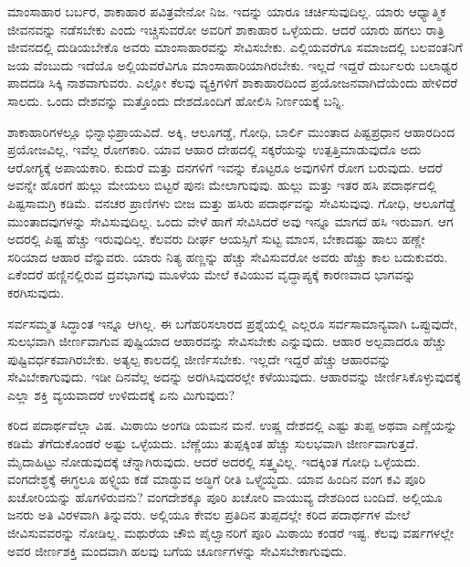 ಮಾಂಸಾಹಾರ ಬರ್ಬರ, ಶಾಕಾಹಾರ ಪವಿತ್ರವೇನೋ ನಿಜ. ಇದನ್ನು ಯಾರೂ ಚರ್ಚಿಸುವುದಿಲ್ಲ. ಯಾರು ಆಧ್ಯಾತ್ಮಿಕ ಜೀವನವನ್ನು ನಡೆಸಬೇಕು ಎಂದು ಇಚ್ಚಿಸುವರೋ ಅವರಿಗೆ ಶಾಕಾಹಾರ ಒಳ್ಳೆಯದು. ಆದರೆ ಯಾರು ಹಗಲು ರಾತ್ರಿ ಜೀವನದಲ್ಲಿ ದುಡಿಯಬೇಕೊ ಅವರು ಮಾಂಸಾಹಾರವನ್ನು ಸೇವಿಸಬೇಕು. ಎಲ್ಲಿಯವರೆಗೂ ಸಮಾಜದಲ್ಲಿ ಬಲವಂತನಿಗೆ ಜಯ ವೆಂಬುದು ಇದೆಯೊ ಅಲ್ಲಿಯವರೆವಿಗೂ ಮಾಂಸಾಹಾರಿಯಾಗಿರಬೇಕು. ಇಲ್ಲದೆ ಇದ್ದರೆ ದುರ್ಬಲರು ಬಲಾಢ್ಯರ ಪಾದದಡಿ ಸಿಕ್ಕಿ ನಾಶವಾಗುವರು. ಎಲ್ಲೋ ಕೆಲವು ವ್ಯಕ್ತಿಗಳಿಗೆ ಶಾಕಾಹಾರದಿಂದ ಪ್ರಯೋಜನವಾಗಿದೆಯೆಂದು ಹೇಳಿದರೆ ಸಾಲದು. ಒಂದು ದೇಶವನ್ನು ಮತ್ತೊಂದು ದೇಶದೊಂದಿಗೆ ಹೋಲಿಸಿ ನಿರ್ಣಯಕ್ಕೆ ಬನ್ನಿ.

ಶಾಕಾಹಾರಿಗಳಲ್ಲೂ ಭಿನ್ನಾಭಿಪ್ರಾಯವಿದೆ. ಅಕ್ಕಿ, ಆಲೂಗಡ್ಡೆ, ಗೋಧಿ, ಬಾರ್ಲಿ ಮುಂತಾದ ಪಿಷ್ಟಪ್ರಧಾನ ಆಹಾರದಿಂದ ಪ್ರಯೋಜವಿಲ್ಲ, ಇವೆಲ್ಲ ರೋಗಕಾರಿ. ಯಾವ ಆಹಾರ ದೇಹದಲ್ಲಿ ಸಕ್ಕರೆಯನ್ನು ಉತ್ಪತ್ತಿಮಾಡುವುದೊ ಅದು ಆರೋಗ್ಯಕ್ಕೆ ಅಪಾಯಕಾರಿ. ಕುದುರೆ ಮತ್ತು ದನಗಳಿಗೆ ಇವನ್ನು ಕೊಟ್ಟರೂ ಅವುಗಳಿಗೆ ರೋಗ ಬರುವುದು. ಆದರೆ ಅವನ್ನೇ ಹೊರಗೆ ಹುಲ್ಲು ಮೇಯಲು ಬಿಟ್ಟರೆ ಪುನಃ ಮೇಲಾಗುವುವು. ಹುಲ್ಲು ಮತ್ತು ಇತರ ಹಸಿ ಪದಾರ್ಥದಲ್ಲಿ ಪಿಷ್ಟಸಾಮಗ್ರಿ ಕಡಿಮೆ. ವನಚರ ಪ್ರಾಣಿಗಳು ಬೀಜ ಮತ್ತು ಹಸಿರು ಪದಾರ್ಥವನ್ನು ಸೇವಿಸುವುವು. ಗೋಧಿ, ಆಲೂಗೆಡ್ಡೆ ಮುಂತಾದವುಗಳನ್ನು ಸೇವಿಸುವುದಿಲ್ಲ. ಒಂದು ವೇಳೆ ಹಾಗೆ ಸೇವಿಸಿದರೆ ಅವು ಇನ್ನೂ ಮಾಗದೆ ಹಸಿ ಇರುವಾಗ. ಆಗ ಅದರಲ್ಲಿ ಪಿಷ್ಟ ಹೆಚ್ಚು ಇರುವುದಿಲ್ಲ. ಕೆಲವರು ದೀರ್ಘ ಆಯಸ್ಸಿಗೆ ಸುಟ್ಟ ಮಾಂಸ, ಬೇಕಾದಷ್ಟು ಹಾಲು ಹಣ್ಣೇ ಸರಿಯಾದ ಆಹಾರ ವೆನ್ನುವರು. ಯಾರು ನಿತ್ಯ ಹಣ್ಣನ್ನು ಹೆಚ್ಚು ಸೇವಿಸುವರೋ ಅವರು ಹೆಚ್ಚು ಕಾಲ ಬದುಕುವರು. ಏಕೆಂದರೆ ಹಣ್ಣಿನಲ್ಲಿರುವ ದ್ರವಭಾಗವು ಮೂಳೆಯ ಮೇಲೆ ಕವಿಯುವ ವೃದ್ಧಾಪ್ಯಕ್ಕೆ ಕಾರಣವಾದ ಭಾಗವನ್ನು ಕರಗಿಸುವುದು.

ಸರ್ವಸಮ್ಮತ ಸಿದ್ಧಾಂತ ಇನ್ನೂ ಆಗಿಲ್ಲ. ಈ ಬಗೆಹರಿಸಲಾರದ ಪ್ರಶ್ನೆಯಲ್ಲಿ ಎಲ್ಲರೂ ಸರ್ವಸಾಮಾನ್ಯವಾಗಿ ಒಪ್ಪುವುದೇ, ಸುಲಭವಾಗಿ ಜೀರ್ಣವಾಗುವ ಪುಷ್ಟಿಯಾದ ಆಹಾರವನ್ನು ಸೇವಿಸಬೇಕು ಎನ್ನುವುದು. ಆಹಾರ ಅಲ್ಪವಾದರೂ ಹೆಚ್ಚು ಪುಷ್ಟಿವರ್ಧಕವಾಗಿರಬೇಕು. ಅತ್ಯಲ್ಪ ಕಾಲದಲ್ಲಿ ಜೀರ್ಣಿಸಬೇಕು. ಇಲ್ಲದೇ ಇದ್ದರೆ ಹೆಚ್ಚು ಆಹಾರವನ್ನು ಸೇವಿಬೇಕಾಗುವುದು. ಇಡೀ ದಿನವೆಲ್ಲ ಅದನ್ನು ಅರಗಿಸಿವುದರಲ್ಲೇ ಕಳೆಯುವುದು. ಆಹಾರವನ್ನು ಜೀರ್ಣಿಸಿಕೊಳ್ಳುವುದಕ್ಕೆ ಎಲ್ಲಾ ಶಕ್ತಿ ವ್ಯಯವಾದರೆ ಉಳಿದುದಕ್ಕೆ ಏನು ಮಿಗುವುದು?

ಕರಿದ ಪದಾರ್ಥವೆಲ್ಲಾ ವಿಷ. ಮಿಠಾಯಿ ಅಂಗಡಿ ಯಮನ ಮನೆ. ಉಷ್ಣ ದೇಶದಲ್ಲಿ ಎಷ್ಟು ತುಪ್ಪ ಅಥವಾ ಎಣ್ಣೆಯನ್ನು ಕಡಿಮೆ ತೆಗೆದುಕೊಂಡರೆ ಅಷ್ಟು ಒಳ್ಳೆಯದು. ಬೆಣ್ಣೆಯು ತುಪ್ಪಕ್ಕಿಂತ ಹೆಚ್ಚು ಸುಲಭವಾಗಿ ಜೀರ್ಣವಾಗುತ್ತದೆ. ಮೈದಾಹಿಟ್ಟು ನೋಡುವುದಕ್ಕೆ ಚೆನ್ನಾಗಿರುವುದು. ಆದರೆ ಅದರಲ್ಲಿ ಸತ್ತ್ವವಿಲ್ಲ. ಇದಕ್ಕಿಂತ ಗೋಧಿ ಒಳ್ಳೆಯದು. ವಂಗದೇಶ್ಧಕ್ಕೆ ಈಗ್ಧಲೂ ಹಳ್ಳ್ಧಿಯ ಕಡೆ ಮಾಡ್ಧುವ ಅಡ್ಧಿಗೆ ರೀತಿ ಒಳ್ಳ್ಧೆಯ್ಧದು. ಯಾವ ಹಿಂದಿನ ವಂಗ ಕವಿ ಪೂರಿ ಖಚೋರಿಯನ್ನು ಹೊಗಳಿರುವನು? ವಂಗದೇಶಕ್ಕೂ ಪೂರಿ ಖಚೋರಿ ವಾಯುವ್ಯ ದೇಶದಿಂದ ಬಂದಿದೆ. ಅಲ್ಲಿಯೂ ಜನರು ಅತಿ ವಿರಳವಾಗಿ ತಿನ್ನುವರು. ಅಲ್ಲಿಯೂ ಕೇವಲ ಪ್ರತಿದಿನ ತುಪ್ಪದಲ್ಲೇ ಕರಿದ ಪದಾರ್ಥಗಳ ಮೇಲೆ ಜೀವಿಸುವವರನ್ನು ನೋಡಿಲ್ಲ. ಮಥುರೆಯ ಚೌಬಿ ಪೈಲ್ವಾನರಿಗೆ ಪೂರಿ ಮಿಠಾಯಿ ಕಂಡರೆ ಇಷ್ಟ. ಕೆಲವು ವರ್ಷಗಳಲ್ಲೇ ಅವರ ಜೀರ್ಣಶಕ್ತಿ ಮಂದವಾಗಿ ಹಲವು ಬಗೆಯ ಚೂರ್ಣಗಳನ್ನು ಸೇವಿಸಬೇಕಾಗುವುದು.

